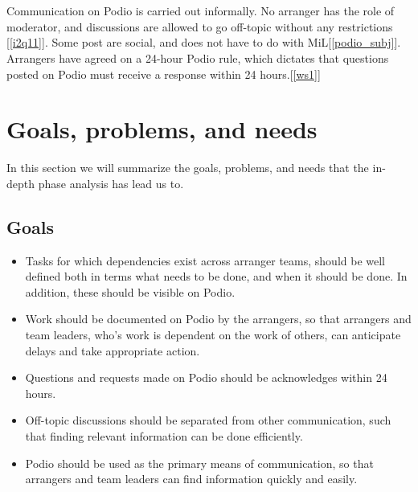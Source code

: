 \\ \\
Communication on Podio is carried out informally. No arranger has the role of moderator, and discussions are allowed to go off-topic without any restrictions [\ref{i2q11}]. Some post are social, and does not have to do with MiL[\ref{podio_subj}]. Arrangers have agreed on a 24-hour Podio rule, which dictates that questions posted on Podio must receive a response within 24 hours.[\ref{ws1}]

\section{Goals, problems, and needs}
\label{sec:goprne}
In this section we will summarize the goals, problems, and needs that the
in-depth phase analysis has lead us to.

\subsection{Goals}
\label{subsec:goals}
\begin{itemize}
    \item Tasks for which dependencies exist across arranger teams, should be well defined both in terms what needs to be done, and when it should be done. In addition, these should be visible on Podio.
    \item Work should be documented on Podio by the arrangers, so that arrangers and team leaders, who's work is dependent on the work of others, can anticipate delays and take appropriate action.
    \item Questions and requests made on Podio should be acknowledges within 24 hours.
    \item Off-topic discussions should be separated from other communication, such that finding relevant information can be done efficiently.
    \item Podio should be used as the primary means of communication, so that arrangers and team leaders can find information quickly and easily.
\end{itemize}

